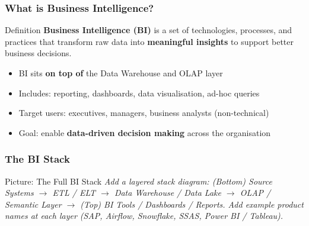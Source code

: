 \begin{frame}
  \frametitle{What is Business Intelligence?}

  \begin{block}{Definition}
    \textbf{Business Intelligence (BI)} is a set of technologies, processes, and
    practices that transform raw data into \textbf{meaningful insights} to support
    better business decisions.
  \end{block}

  \begin{itemize}
    \item BI sits \textbf{on top of} the Data Warehouse and OLAP layer
    \item Includes: reporting, dashboards, data visualisation, ad-hoc queries
    \item Target users: executives, managers, business analysts (non-technical)
    \item Goal: enable \textbf{data-driven decision making} across the organisation
  \end{itemize}

\end{frame}

\begin{frame}
  \frametitle{The BI Stack}

  \begin{alertblock}{Picture: The Full BI Stack}
    \textit{Add a layered stack diagram:
    (Bottom) Source Systems
    $\to$ ETL / ELT
    $\to$ Data Warehouse / Data Lake
    $\to$ OLAP / Semantic Layer
    $\to$ (Top) BI Tools / Dashboards / Reports.
    Add example product names at each layer (SAP, Airflow, Snowflake,
    SSAS, Power BI / Tableau).}
  \end{alertblock}

\end{frame}

